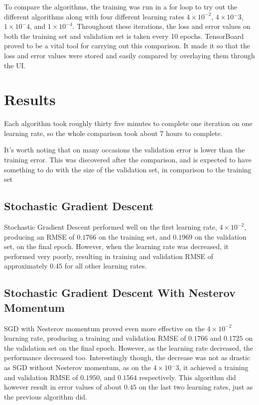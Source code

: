 \documentclass[12pt,a4paper,oneside,oldfontcommands]{memoir}
\begin{document}
To compare the algorithms, the training was run in a for loop to try out the different algorithms along with four different learning rates \(4\times10^{-2}\), \(4\times10{^-3}\), \(1\times{10^-4}\), and \(1\times10^{-4}\). Throughout these iterations, the loss and error values on both the training set and validation set is taken every 10 epochs. TensorBoard proved to be a vital tool for carrying out this comparison. It made it so that the loss and error values were stored and easily compared by overlaying them through the UI.

\section{Results}

Each algorithm took roughly thirty five minutes to complete one iteration on one learning rate, so the whole comparison took about 7 hours to complete.

It's worth noting that on many occasions the validation error is lower than the training error. This was discovered after the comparison, and is expected to have something to do with the size of the validation set, in comparison to the training set

\subsection{Stochastic Gradient Descent}

Stochastic Gradient Descent performed well on the first learning rate, \(4\times10^{-2}\), producing an RMSE of \(0.1766\) on the training set, and \(0.1969\) on the validation set, on the final epoch. However, when the learning rate was decreased, it performed very poorly, resulting in training and validation RMSE of approximately \(0.45\) for all other learning rates.

\subsection{Stochastic Gradient Descent With Nesterov Momentum}

SGD with Nesterov momentum proved even more effective on the \(4\times10^{-2}\) learning rate, producing a training and validation RMSE of \(0.1766\) and \(0.1725\) on the validation set on the final epoch. However, as the learning rate decreased, the performance decreased too. Interestingly though, the decrease was not as drastic as SGD without Nesterov momentum, as on the \(4\times10{^-3}\), it achieved a training and validation RMSE of \(0.1950\), and \(0.1564\) respectively. This algorithm did however result in error values of about \(0.45\) on the last two learning rates, just as the previous algorithm did.
\end{document}

